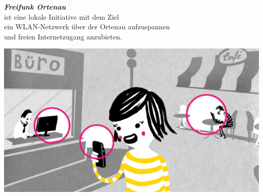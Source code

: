 \documentclass[a4paper]{article}
\begin{document}
\thispagestyle{empty}

\begin{center}
\Huge \textit{\textbf{\textcolor{freifunkpink}{Freifunk Ortenau}}} \\
\vspace{0.6cm}
\large ist eine lokale Initiative mit dem Ziel \\
\large ein WLAN-Netzwerk über der Ortenau aufzuspannen \\
\large und freien Internetzugang anzubieten.
\normalsize

\vspace{1.7cm}

\hspace*{-0.05 \paperwidth}\includegraphics[width=\paperwidth]{../../images/city_center}
\end{center}

\vspace{0.8cm}
\end{document}
